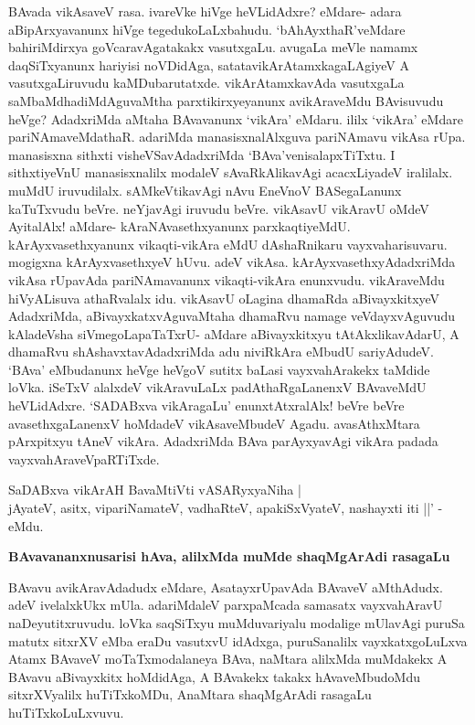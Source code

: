 BAvada vikAsaveV rasa. ivareVke hiVge heVLidAdxre? eMdare- adara aBipArxyavanunx hiVge tegedukoLaLxbahudu. `bAhAyxthaR'veMdare bahiriMdirxya goVcaravAgatakakx vasutxgaLu. avugaLa meVle namamx daqSiTxyanunx hariyisi noVDidAga, satatavikArAtamxkagaLAgiyeV A vasutxgaLiruvudu kaMDubarutatxde. vikArAtamxkavAda vasutxgaLa saMbaMdhadiMdAguvaMtha parxtikirxyeyanunx avikAraveMdu BAvisuvudu heVge? AdadxriMda aMtaha BAvavanunx `vikAra' eMdaru. ililx `vikAra' eMdare pariNAmaveMdathaR. adariMda manasisxnalAlxguva pariNAmavu vikAsa rUpa. manasisxna sithxti visheVSavAdadxriMda `BAva'venisalapxTiTxtu. I sithxtiyeVnU manasisxnalilx modaleV sAvaRkAlikavAgi acacxLiyadeV iralilalx. muMdU iruvudilalx. sAMkeVtikavAgi nAvu EneVnoV BASegaLanunx kaTuTxvudu beVre. neYjavAgi iruvudu beVre. vikAsavU vikAravU oMdeV AyitalAlx! aMdare- kAraNAvasethxyanunx parxkaqtiyeMdU. kArAyxvasethxyanunx vikaqti-vikAra eMdU dAshaRnikaru vayxvaharisuvaru. mogigxna kArAyxvasethxyeV hUvu. adeV vikAsa. kArAyxvasethxyAdadxriMda vikAsa rUpavAda pariNAmavanunx vikaqti-vikAra enunxvudu. vikAraveMdu hiVyALisuva athaRvalalx idu. vikAsavU oLagina dhamaRda aBivayxkitxyeV AdadxriMda, aBivayxkatxvAguvaMtaha dhamaRvu namage veVdayxvAguvudu kAladeVsha siVmegoLapaTaTxrU- aMdare aBivayxkitxyu tAtAkxlikavAdarU, A dhamaRvu shAshavxtavAdadxriMda adu niviRkAra eMbudU sariyAdudeV. `BAva' eMbudanunx heVge heVgoV sutitx baLasi vayxvahArakekx taMdide loVka. iSeTxV alalxdeV vikAravuLaLx padAthaRgaLanenxV BAvaveMdU heVLidAdxre. `SADABxva vikAragaLu'\label{226} enunxtAtxralAlx! beVre beVre avasethxgaLanenxV hoMdadeV vikAsaveMbudeV Agadu. avasAthxMtara pArxpitxyu tAneV vikAra. AdadxriMda BAva parAyxyavAgi vikAra padada vayxvahAraveVpaRTiTxde.

\begin{shloka}
SaDABxva vikArAH BavaMtiVti vASARyxyaNiha | \\
jAyateV, asitx, vipariNamateV, vadhaRteV, apakiSxVyateV, nashayxti iti ||' -eMdu.
\end{shloka}

\noindent
{\bf\large{BAvavananxnusarisi hAva, alilxMda muMde shaqMgArAdi rasagaLu}}\label{page226}

BAvavu avikAravAdadudx eMdare, AsatayxrUpavAda BAvaveV aMthAdudx. adeV ivelalxkUkx mUla. adariMdaleV parxpaMcada samasatx vayxvahAravU naDeyutitxruvudu. loVka saqSiTxyu muMduvariyalu modalige mUlavAgi puruSa matutx sitxrXV eMba eraDu vasutxvU idAdxga, puruSanalilx vayxkatxgoLuLxva Atamx BAvaveV moTaTxmodalaneya BAva, naMtara alilxMda muMdakekx A BAvavu aBivayxkitx hoMdidAga, A BAvakekx takakx hAvaveMbudoMdu sitxrXVyalilx huTiTxkoMDu, AnaMtara shaqMgArAdi rasagaLu huTiTxkoLuLxvuvu.

